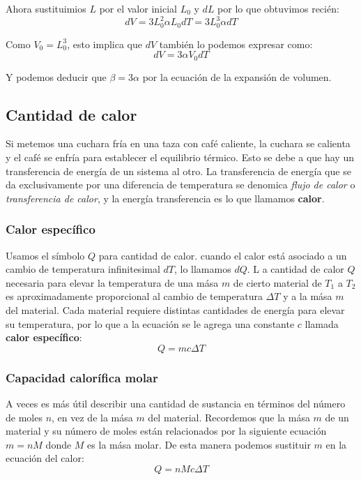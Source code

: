 \documentclass[12pt]{article}
\begin{document}
  Ahora sustituimios $ L $ por el valor inicial $ L_{0} $ y $ dL $ por lo que obtuvimos recién:
  \[
  dV = 3L_{0}^{2}\alpha L_{0}dT = 3L_{0}^{3}\alpha dT
  \]

  Como $ V_{0} = L_{0}^{3} $, esto implica que $ dV $ también lo podemos expresar como:
  \[
  dV = 3\alpha V_{0}dT
  \]

  Y podemos deducir que $ \beta = 3\alpha $ por la ecuación de la expansión de volumen.
  
  \subsection{Cantidad de calor}
  Si metemos una cuchara fría en una taza con café caliente, la cuchara se calienta y el café se enfría para establecer el equilibrio térmico. Esto se debe a que hay un transferencia de energía de un sistema al otro. La transferencia de energía que se da exclusivamente por una diferencia de temperatura se denomica \textit{flujo de calor} o \textit{transferencia de calor}, y la energía transferencia es lo que llamamos \textbf{calor}.

  \subsubsection{Calor específico}
  Usamos el símbolo $ Q $ para cantidad de calor. cuando el calor está asociado a un cambio de temperatura infinitesimal $ dT $, lo llamamos $ dQ $. L a cantidad de calor $ Q $ necesaria para elevar la temperatura de una mása $ m $ de cierto material de $ T_{1} $ a $ T_{2} $ es aproximadamente proporcional al cambio de temperatura $ \Delta T $ y a la mása $ m $ del material. Cada material requiere distintas cantidades de energía para elevar su temperatura, por lo que a la ecuación se le agrega una constante $ c $ llamada \textbf{calor específico}:
  \[
  Q = mc\Delta T
  \]

  \vspace{0.2cm}

  \subsubsection{Capacidad calorífica molar}
  A veces es más útil describir una cantidad de sustancia en términos del número de moles $ n $, en vez de la mása $ m $ del material. Recordemos que la mása $ m $ de un material y su número de moles están relacionados por la siguiente ecuación $ m = nM $ donde $ M $ es la mása molar. De esta manera podemos sustituir $ m $ en la ecuación del calor:
  \[
  Q = nMc\Delta T
  \]
\end{document}
